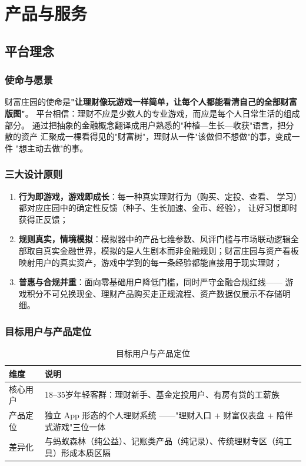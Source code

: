 \documentclass[12pt,a4paper]{ctexart}
\begin{document}
\section{产品与服务}

\subsection{平台理念}

\subsubsection{使命与愿景}
财富庄园的使命是\textbf{"让理财像玩游戏一样简单，让每个人都能看清自己的全部财富版图"}。
平台相信：理财不应是少数人的专业游戏，而应是每个人日常生活的组成部分。
通过把抽象的金融概念翻译成用户熟悉的"种植—生长—收获"语言，把分散的资产
汇聚成一棵看得见的"财富树"，理财从一件"该做但不想做"的事，变成一件
"想主动去做"的事。

\subsubsection{三大设计原则}
\begin{enumerate}
  \item \textbf{行为即游戏，游戏即成长}：每一种真实理财行为（购买、定投、查看、
        学习）都对应庄园中的确定性反馈（种子、生长加速、金币、经验），
        让好习惯即时获得正反馈；
  \item \textbf{规则真实，情境模拟}：模拟器中的产品七维参数、风评门槛与市场联动逻辑全部取自真实金融世界，模拟的是人生剧本而非金融规则；财富庄园与资产看板映射用户的真实资产，游戏中学到的每一条经验都能直接用于现实理财；
  \item \textbf{普惠与合规并重}：面向零基础用户降低门槛，同时严守金融合规红线——
        游戏积分不可兑换现金、理财产品购买走正规流程、资产数据仅展示不存储明细。
\end{enumerate}

\subsubsection{目标用户与产品定位}
\begin{table}[htbp]
\centering
\begin{tabular}{p{3cm}p{9.5cm}}
\toprule
\textbf{维度} & \textbf{说明} \\
\midrule
核心用户 & 18--35岁年轻客群：理财新手、基金定投用户、有房有贷的工薪族 \\
产品定位 & 独立 App 形态的个人理财系统 ——"理财入口 + 财富仪表盘 + 陪伴式游戏"三位一体 \\
差异化 & 与蚂蚁森林（纯公益）、记账类产品（纯记录）、传统理财专区（纯工具）形成本质区隔 \\
\bottomrule
\end{tabular}
\caption{目标用户与产品定位}
\end{table}
\end{document}

